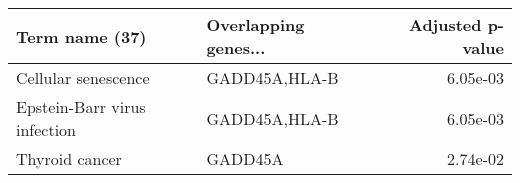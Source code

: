\begin{tabular}{llr}
\toprule
              Term name (37) & Overlapping genes... &  Adjusted p-value \\
\midrule
         Cellular senescence &        GADD45A,HLA-B &          6.05e-03 \\
Epstein-Barr virus infection &        GADD45A,HLA-B &          6.05e-03 \\
              Thyroid cancer &              GADD45A &          2.74e-02 \\
\bottomrule
\end{tabular}
